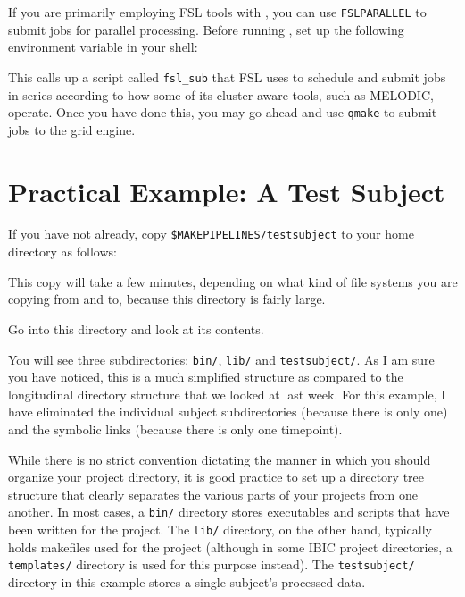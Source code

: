 If you are primarily employing FSL tools with \maken, you can use \texttt{FSLPARALLEL} to submit jobs for parallel processing. Before running \maken, set up the following environment variable in your shell:

This calls up a script called \texttt{fsl_sub} that FSL uses to schedule and submit jobs in series according to how some of its cluster aware tools, such as MELODIC, operate. Once you have done this, you may go ahead and use \texttt{qmake} to submit jobs to the grid engine. 

\section{Practical Example: A Test Subject}
If you have not already, copy \texttt{\$MAKEPIPELINES/testsubject} to your home directory as follows:

This copy will take a few minutes, depending on what kind of file systems you are copying from and to, because this directory is fairly large.

Go into this directory and look at its contents.

You will see three subdirectories: \texttt{bin/}, \texttt{lib/} and \texttt{testsubject/}. 
As I am sure you have noticed, this is a much simplified structure as compared to the longitudinal directory structure that we looked at last week. For this example, I have eliminated the individual subject subdirectories (because there is only one) and the symbolic links (because there is only one timepoint). 

While there is no strict convention dictating the manner in which you should organize your project directory, it is good practice to set up a directory tree structure that clearly separates the various parts of your projects from one another. In most cases, a \texttt{bin/} directory stores executables and scripts that have been written for the project. The \texttt{lib/} directory, on the other hand, typically holds makefiles used for the project (although in some IBIC project directories, a \texttt{templates/} directory is used for this purpose instead). The \texttt{testsubject/} directory in this example stores a single subject's processed data.


